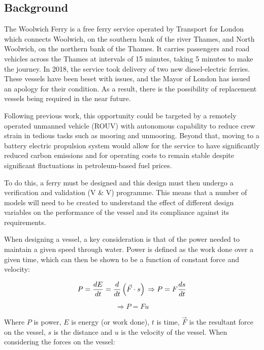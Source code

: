 \documentclass[../main.tex]{subfiles}
\begin{document}
\subsection{Background}

The Woolwich Ferry is a free ferry service operated by Transport for London which connects Woolwich, on the southern bank of the river Thames, and North Woolwich, on the northern bank of the Thames\cite{tfl1}.
It carries passengers and road vehicles across the Thames at intervals of 15 minutes, taking 5 minutes to make the journey\cite{tfl2}.
In 2018, the service took delivery of two new diesel-electric ferries.
These vessels have been beset with issues, and the Mayor of London has issued an apology for their condition\cite{LBC2026}.
As a result, there is the possibility of replacement vessels being required in the near future.

Following previous work\cite{Morton2026}, this opportunity could be targeted by a remotely operated unmanned vehicle (ROUV) with autonomous capability to reduce crew strain in tedious tasks such as mooring and unmooring.
Beyond that, moving to a battery electric propulsion system would allow for the service to have significantly reduced carbon emissions and for operating costs to remain stable despite significant fluctuations in petroleum-based fuel prices.

To do this, a ferry must be designed and this design must then undergo a verification and validation (V \& V) programme.
This means that a number of models will need to be created to understand the effect of different design variables on the performance of the vessel and its compliance against its requirements.

When designing a vessel, a key consideration is that of the power needed to maintain a given speed through water.
Power is defined as the work done over a given time, which can then be shown to be a function of constant force and velocity:

\[P = \frac{d E}{d t} = \frac{d}{d t} \left(\vec{F} \cdot s \right)\\
\Rightarrow P = F\frac{d s}{d t}\]

\begin{equation}
    \Rightarrow P = Fu
\end{equation}

Where $P$ is power, $E$ is energy (or work done), $t$ is time, $\vec{F}$ is the resultant force on the vessel, $s$ is the distance and $u$ is the velocity of the vessel.
When considering the forces on the vessel:
\end{document}
